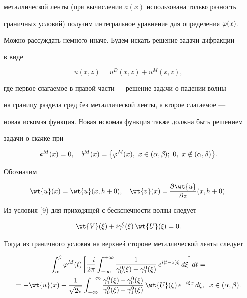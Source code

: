 металлической ленты (при вычислении $a(x)$ использована только разность


граничных условий) получим интегральное уравнение для определения $\varphi(x)$.





Можно рассуждать немного иначе. Будем искать решение задачи дифракции


в виде


$$


u(x,z) = u^D(x,z)+u^M(x,z),


$$


где первое слагаемое в правой части --- решение задачи о падении волны


на границу раздела сред без металлической ленты, а второе слагаемое ---


новая искомая функция. Новая искомая функция также должна быть решением


задачи о скачке при


$$


a^M(x)=0,\quad


b^M(x)= \bigl\{ \fy^M(x),\ x\in(\al,\be); 


\ 0,\ x\notin (\al,\be) \bigr\} .


$$


Обозначим


$$


\wt{u}(x)=\wt{u}(x,h+0),\quad


\wt{v}(x)=\frac{\pa\wt{u}}{\pa z}(x,h+0) .


$$


Из условия (9) для приходящей с бесконечности волны следует


$$


\wt{V}(\xi)+i\gaoxi{1}\,\wt{U}(\xi) = 0 .


$$


Тогда из граничного условия на верхней стороне металлической ленты следует


\begin{multline}


\int_{\al}^{\be} \fy^M(t)\,\bigg[ \frac{-i}{2\pi}


\int_{-\infty}^{+\infty}


\frac{1}{\gaoxi{0}+\gaoxi{1}}


\,e^{i(t-x)\xi}\,d\xi \bigg] dt =\\


%


= - \wt{u}(x)


- \frac{1}{\sqrt{2\pi}}\int_{-\infty}^{+\infty}


\frac{\gaoxi{1}-\gaoxi{0}}{\gaoxi{0}+\gaoxi{1}}\,


\wt{U}(\xi)\,e^{-i\xi x}\,d\xi ,\ \; x\in (\al, \be).


\end{multline}





